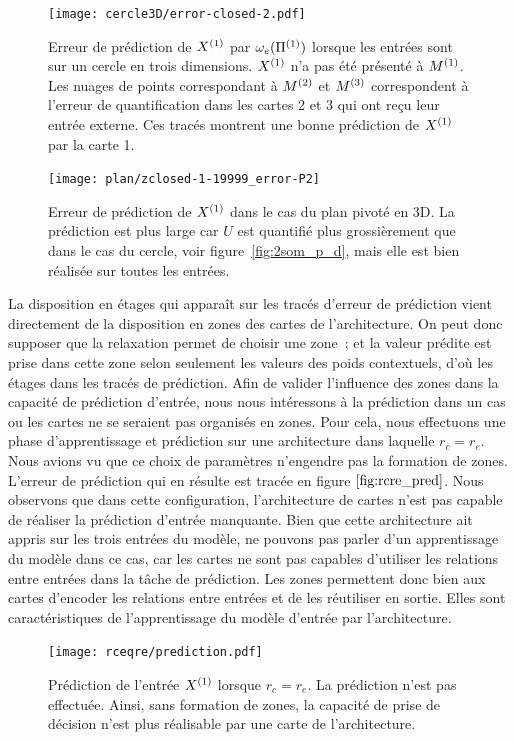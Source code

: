 \documentclass[../main]{subfiles}
\begin{document}
\begin{figure}
	\texttt{[image: cercle3D/error-closed-2.pdf]}
	\caption{Erreur de prédiction de $X^{({1})}$ par $\omega_e(\Pi^{({1})})$ lorsque les entrées sont sur un cercle en trois dimensions. $X^{({1})}$ n'a pas été présenté à $M^{({1})}$.
	 Les nuages de points correspondant à $M^{({2})}$ et $M^{({3})}$ correspondent à l'erreur de quantification dans les cartes 2 et 3 qui ont reçu leur entrée externe. Ces tracés montrent une bonne prédiction de $X^{({1})}$ par la carte 1. \label{fig:pred_cercle}}
\end{figure}

\begin{figure}
	\texttt{[image: plan/zclosed-1-19999\_error-P2]}	
	\caption{Erreur de prédiction de $X^{({1})}$ dans le cas du plan pivoté en 3D. La prédiction est plus large car $U$ est quantifié plus grossièrement que dans le cas du cercle, voir figure~\ref{fig:2som_p_d}, mais elle est bien réalisée sur toutes les entrées. \label{fig:plan3_pred}}
\end{figure}

La disposition en étages qui apparaît sur les tracés d'erreur de prédiction vient directement de la disposition en zones des cartes de l'architecture. 
On peut donc supposer que la relaxation permet de choisir une zone~; et la valeur prédite est prise dans cette zone selon seulement les valeurs des poids contextuels, d'où les \og étages \fg{} dans les tracés de prédiction.
Afin de valider l'influence des zones dans la capacité de prédiction d'entrée, nous nous intéressons à la prédiction dans un cas ou les cartes ne se seraient pas organisés en zones.
Pour cela, nous effectuons une phase d'apprentissage et prédiction sur une architecture dans laquelle $r_c = r_e$. 
Nous avions vu que ce choix de paramètres n'engendre pas la formation de zones. L'erreur de prédiction qui en résulte est tracée en figure $\ref{fig:rcre_pred}$.
Nous observons que dans cette configuration, l'architecture de cartes n'est pas capable de réaliser la prédiction d'entrée manquante.
Bien que cette architecture ait appris sur les trois entrées du modèle, ne pouvons pas parler d'un apprentissage du modèle dans ce cas, car les cartes ne sont pas capables d'utiliser les relations entre entrées dans la tâche de prédiction.
Les zones permettent donc bien aux cartes d'encoder les relations entre entrées et de les réutiliser en sortie. Elles sont caractéristiques de l'apprentissage du modèle d'entrée par l'architecture.

\begin{figure}
	\centering\texttt{[image: rceqre/prediction.pdf]}
	\caption{Prédiction de l'entrée $X^{({1})}$ lorsque $r_c = r_e$. La prédiction n'est pas effectuée. Ainsi, sans formation de zones, la capacité de prise de décision n'est plus réalisable par une carte de l'architecture. \label{fig:rcre_pred}}
\end{figure}
\end{document}
